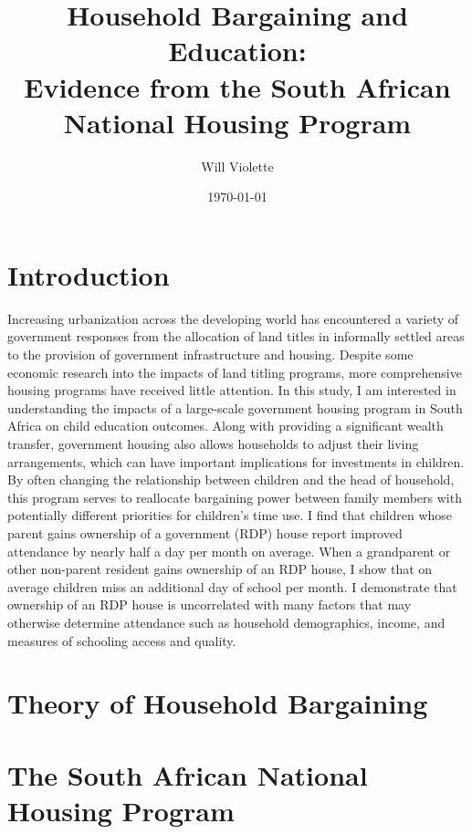 \documentclass[11pt]{article} %
\title{Household Bargaining and Education: \\ Evidence from the South African National Housing Program}
\date{\today}
\author{Will Violette}
\begin{document}
\maketitle

\large

\section*{Introduction}

Increasing urbanization across the developing world has encountered a variety of government responses from the allocation of land titles in informally settled areas to the provision of government infrastructure and housing.  Despite some economic research into the impacts of land titling programs, more comprehensive housing programs have received little attention.  In this study, I am interested in understanding the impacts of a large-scale government housing program in South Africa on child education outcomes.  Along with providing a significant wealth transfer, government housing also allows households to adjust their living arrangements, which can have important implications for investments in children.  By often changing the relationship between children and the head of household, this program serves to reallocate bargaining power between family members with potentially different priorities for children's time use.  I find that children whose parent gains ownership of a government (RDP) house report improved attendance by nearly half a day per month on average.  When a grandparent or other non-parent resident gains ownership of an RDP house, I show that on average children miss an additional day of school per month.  I demonstrate that ownership of an RDP house is uncorrelated with many factors that may otherwise determine attendance such as household demographics, income, and measures of schooling access and quality.  

\section*{Theory of Household Bargaining}


\section*{The South African National Housing Program}
\end{document}
